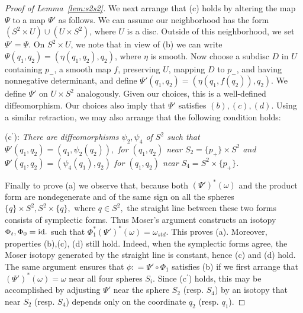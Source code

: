 \documentclass[11pt, reqno]{amsart}
\theoremstyle{remark}
\numberwithin{equation}{subsection}
\numberwithin{figure}{section}
\theoremstyle{customremark}
\newcommand{\om}{{\omega}}
\newcommand{\MS}{{\medskip}}
\begin{document}
\begin{proof}[Proof of Lemma~\ref{lem:s2s2}]
We next arrange that (c) holds by
 altering the map $\Psi$ to a map $\Psi'$ as follows.  We can assume our neighborhood has the form $(S^2 \times U) \cup (U \times S^2)$, where $U$ is a disc.  Outside of this neighborhood, we set $\Psi' = \Psi$.  On $S^2 \times U$, we note that in view of (b) we can write $\Psi(q_1,q_2) = (\eta(q_1,q_2),q_2)$, where $\eta$ is smooth.  Now choose a subdisc $D$ in $U$ containing $p_-$,
 a smooth map $f$, preserving $U$, mapping $D$ to $p_-$, and having nonnegative determinant, and define $\Psi'(q_1,q_2) = (\eta(q_1,f(q_2)),q_2)$.  We define $\Psi'$ on $U \times S^2$ analogously.   Given our choices, this is a well-defined diffeomorphism.  Our choices also imply that $\Psi'$ satisfies $(b) , (c), (d)$.
 Using a similar retraction, we may also  arrange that the following condition holds:
 \MS
 
 (c$^\prime$): {\it There are diffeomorphisms $\psi_2, \psi_4$ of $S^2$ such that $\Psi'(q_1,q_2) = (q_1, \psi_2(q_2)),$ for $(q_1,q_2)$ near $S_2 = \{p_+\}\times S^2$ and
 $\Psi'(q_1,q_2) = (\psi_4(q_1),q_2)$ for $(q_1,q_2)$ near $S_4 = S^2\times \{p_+\}$.} 
 
 \MS
 
 Finally to prove (a) we observe that, because both $(\Psi')^*(\om)$ and the product form are nondegenerate and of the same sign on all the spheres $\{q\}\times S^2, S^2\times \{q\},$ where $q\in S^2,$ the straight line between these two forms consists of symplectic forms. Thus Moser's argument constructs an isotopy $\Phi_t, \Phi_0 = {\rm id.}$ such that $\Phi_1^*(\Psi')^*(\om) = \om_{std}$.   This proves (a). Moreover, properties (b),(c), (d) still hold.
  Indeed, when the symplectic forms agree, the Moser isotopy generated by the straight line is constant, hence (c) and (d) hold.  
  The same argument ensures that  $\phi: = \Psi'\circ \Phi_1$ satisfies (b)
 if we  first arrange that $(\Psi')^*(\om) = \om$ near all four spheres $S_i$.  Since (c$^\prime$) holds, this  may be accomplished by adjusting $\Psi'$ near the sphere $S_2$ (resp. $S_4$) by an isotopy that near $S_2$ (resp. $S_4$) depends only on the coordinate $q_2$ (resp. $q_1$).  \end{proof}
 \MS
 
\end{document}
